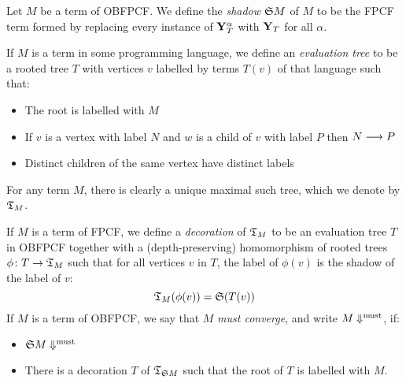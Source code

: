 \documentclass{article}
\begin{document}
\begin{definition}
  Let $M$ be a term of OBFPCF.  We define the \emph{shadow} $\mathfrak{S} M$ of $M$ to be the FPCF term formed by replacing every instance of $\mathbf{Y}_T^\alpha$ with $\mathbf{Y}_T$ for all $\alpha$.

  If $M$ is a term in some programming language, we define an \emph{evaluation tree} to be a rooted tree $T$ with vertices $v$ labelled by terms $T(v)$ of that language such that:
  \begin{itemize}
    \item The root is labelled with $M$
    \item If $v$ is a vertex with label $N$ and $w$ is a child of $v$ with label $P$ then $N\longrightarrow P$
    \item Distinct children of the same vertex have distinct labels
  \end{itemize}
  For any term $M$, there is clearly a unique maximal such tree, which we denote by $\mathfrak{T}_M$.

  If $M$ is a term of FPCF, we define a \emph{decoration} of $\mathfrak{T}_M$ to be an evaluation tree $T$ in OBFPCF together with a (depth-preserving) homomorphism of rooted trees $\phi\colon T\to\mathfrak{T}_M$ such that for all vertices $v$ in $T$, the label of $\phi(v)$ is the shadow of the label of $v$:
  \[
    \mathfrak{T}_M(\phi(v)) = \mathfrak{S}(T(v))
    \]
  If $M$ is a term of OBFPCF, we say that $M$ \emph{must converge}, and write $M\Downarrow^{\text{must}}$, if:
  \begin{itemize}
    \item $\mathfrak{S} M\Downarrow^{\text{must}}$
    \item There is a decoration $T$ of $\mathfrak{T}_{\mathfrak{S} M}$ such that the root of $T$ is labelled with $M$.
  \end{itemize}
\end{definition}
\end{document}
